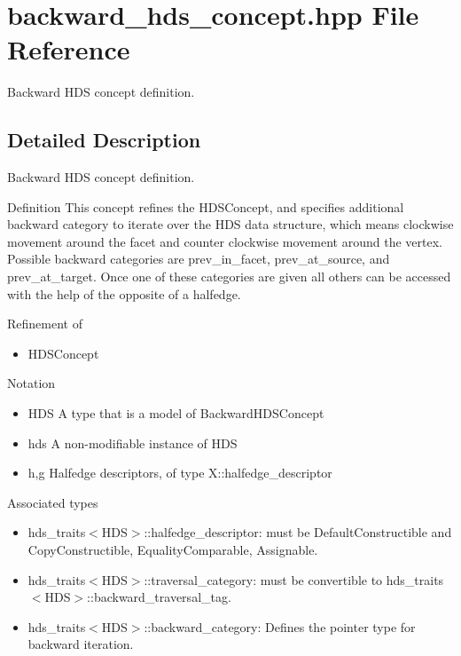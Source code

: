 \section{backward\_\-hds\_\-concept.hpp File Reference}
\label{backward__hds__concept_8hpp}
Backward HDS concept definition. 



\subsection{Detailed Description}
Backward HDS concept definition. 

\begin{Desc}
\item[Definition]This concept refines the HDSConcept, and specifies additional backward category to iterate over the HDS data structure, which means clockwise movement around the facet and counter clockwise movement around the vertex. Possible backward categories are prev\_\-in\_\-facet, prev\_\-at\_\-source, and prev\_\-at\_\-target. Once one of these categories are given all others can be accessed with the help of the opposite of a halfedge.\end{Desc}
\begin{Desc}
\item[Refinement of]\begin{itemize}
\item HDSConcept\end{itemize}
\end{Desc}
\begin{Desc}
\item[Notation]\begin{itemize}
\item HDS A type that is a model of Backward\-HDSConcept\item hds A non-modifiable instance of HDS\item h,g Halfedge descriptors, of type X::halfedge\_\-descriptor\end{itemize}
\end{Desc}
\begin{Desc}
\item[Associated types]\begin{itemize}
\item hds\_\-traits$<$HDS$>$::halfedge\_\-descriptor: must be Default\-Constructible and Copy\-Constructible, Equality\-Comparable, Assignable.\item hds\_\-traits$<$HDS$>$::traversal\_\-category: must be convertible to hds\_\-traits$<$HDS$>$::backward\_\-traversal\_\-tag.\item hds\_\-traits$<$HDS$>$::backward\_\-category: Defines the pointer type for backward iteration.\end{itemize}
\end{Desc}
